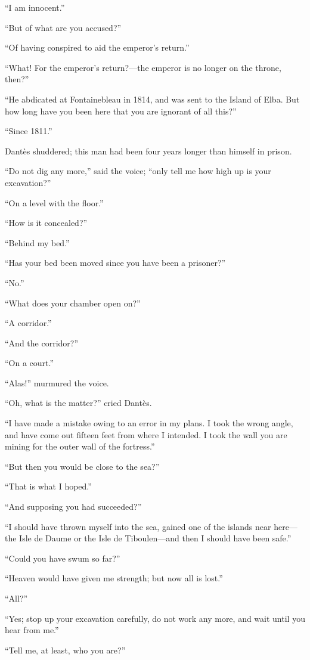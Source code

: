 “I am innocent.”

“But of what are you accused?”

“Of having conspired to aid the emperor’s return.”

“What! For the emperor’s return?—the emperor is no longer on the
throne, then?”

“He abdicated at Fontainebleau in 1814, and was sent to the Island of
Elba. But how long have you been here that you are ignorant of all
this?”

“Since 1811.”

Dantès shuddered; this man had been four years longer than himself in
prison.

“Do not dig any more,” said the voice; “only tell me how high up is
your excavation?”

“On a level with the floor.”

“How is it concealed?”

“Behind my bed.”

“Has your bed been moved since you have been a prisoner?”

“No.”

“What does your chamber open on?”

“A corridor.”

“And the corridor?”

“On a court.”

“Alas!” murmured the voice.

“Oh, what is the matter?” cried Dantès.

“I have made a mistake owing to an error in my plans. I took the wrong
angle, and have come out fifteen feet from where I intended. I took the
wall you are mining for the outer wall of the fortress.”

“But then you would be close to the sea?”

“That is what I hoped.”

“And supposing you had succeeded?”

“I should have thrown myself into the sea, gained one of the islands
near here—the Isle de Daume or the Isle de Tiboulen—and then I should
have been safe.”

“Could you have swum so far?”

“Heaven would have given me strength; but now all is lost.”

“All?”

“Yes; stop up your excavation carefully, do not work any more, and wait
until you hear from me.”

“Tell me, at least, who you are?”

